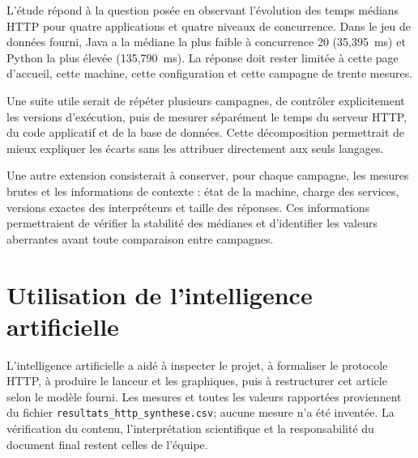 \documentclass[conference,11pt]{IEEEtran}
\begin{document}
L'étude répond à la question posée en observant l'évolution des temps
médians HTTP pour quatre applications et quatre niveaux de concurrence. Dans
le jeu de données fourni, Java a la médiane la plus faible à concurrence 20
(35,395~ms) et Python la plus élevée (135,790~ms). La réponse doit rester
limitée à cette page d'accueil, cette machine, cette configuration et cette
campagne de trente mesures.

Une suite utile serait de répéter plusieurs campagnes, de contrôler
explicitement les versions d'exécution, puis de mesurer séparément le temps
du serveur HTTP, du code applicatif et de la base de données. Cette
décomposition permettrait de mieux expliquer les écarts sans les attribuer
directement aux seuls langages.

Une autre extension consisterait à conserver, pour chaque campagne, les
mesures brutes et les informations de contexte : état de la machine, charge
des services, versions exactes des interpréteurs et taille des réponses.
Ces informations permettraient de vérifier la stabilité des médianes et
d'identifier les valeurs aberrantes avant toute comparaison entre campagnes.

\section*{Utilisation de l'intelligence artificielle}

L'intelligence artificielle a aidé à inspecter le projet, à formaliser le
protocole HTTP, à produire le lanceur et les graphiques, puis à restructurer
cet article selon le modèle fourni. Les mesures et toutes les valeurs
rapportées proviennent du fichier
\texttt{resultats\_http\_synthese.csv}; aucune mesure n'a été inventée.
La vérification du contenu, l'interprétation scientifique et la
responsabilité du document final restent celles de l'équipe.
\end{document}
